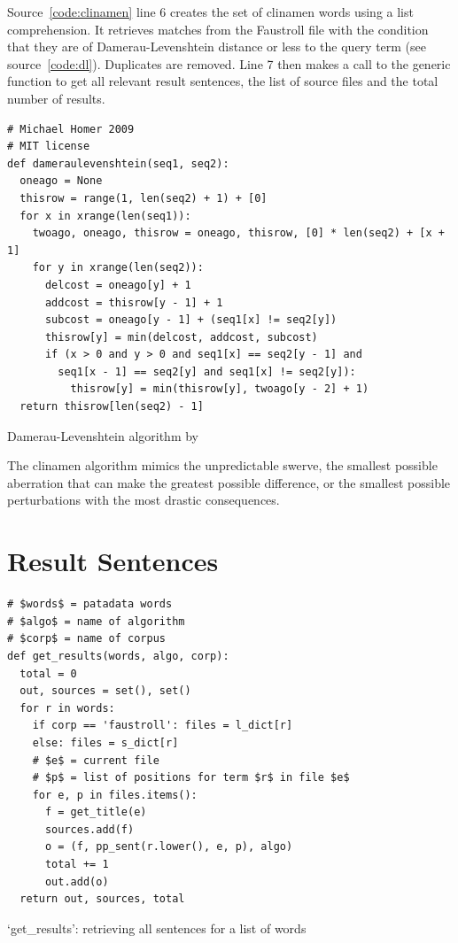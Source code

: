 Source~\ref{code:clinamen} line 6 creates the set of clinamen words using a list comprehension. It retrieves matches from the Faustroll file  with the condition that they are of Damerau-Levenshtein distance  or less to the query term  (see source~\ref{code:dl}). Duplicates are removed. Line 7 then makes a call to the generic  function to get all relevant result sentences, the list of source files and the total number of results.

\begin{listing}[!htbp] %
  \begin{verbatim}
# Michael Homer 2009
# MIT license
def dameraulevenshtein(seq1, seq2):
  oneago = None
  thisrow = range(1, len(seq2) + 1) + [0]
  for x in xrange(len(seq1)):
    twoago, oneago, thisrow = oneago, thisrow, [0] * len(seq2) + [x + 1]
    for y in xrange(len(seq2)):
      delcost = oneago[y] + 1
      addcost = thisrow[y - 1] + 1
      subcost = oneago[y - 1] + (seq1[x] != seq2[y])
      thisrow[y] = min(delcost, addcost, subcost)
      if (x > 0 and y > 0 and seq1[x] == seq2[y - 1] and
        seq1[x - 1] == seq2[y] and seq1[x] != seq2[y]):
          thisrow[y] = min(thisrow[y], twoago[y - 2] + 1)
  return thisrow[len(seq2) - 1]
  \end{verbatim}
\caption[`dameraulevenshtein' function]{Damerau-Levenshtein algorithm by \autocite{Homer2009}}
\label{code:dl}
\end{listing}

The clinamen algorithm mimics the unpredictable swerve, the smallest possible aberration that can make the greatest possible difference, or the smallest possible perturbations with the most drastic consequences. 


\section{Result Sentences}
\label{s:ressent}


\begin{listing}[!htbp] %
  \begin{verbatim}
# $words$ = patadata words
# $algo$ = name of algorithm
# $corp$ = name of corpus
def get_results(words, algo, corp):
  total = 0
  out, sources = set(), set()
  for r in words:
    if corp == 'faustroll': files = l_dict[r]
    else: files = s_dict[r]
    # $e$ = current file
    # $p$ = list of positions for term $r$ in file $e$
    for e, p in files.items():
      f = get_title(e)
      sources.add(f)
      o = (f, pp_sent(r.lower(), e, p), algo)
      total += 1
      out.add(o)
  return out, sources, total
  \end{verbatim}
\caption[`get\_results' function]{`get\_results': retrieving all sentences for a list of words}
\label{code:getresults}
\end{listing}

